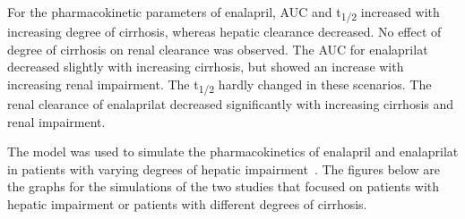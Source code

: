
For the pharmacokinetic parameters of enalapril, AUC and t\textsubscript{1/2} increased with increasing degree of cirrhosis, whereas hepatic clearance decreased. No effect of degree of cirrhosis on renal clearance was observed. The AUC for enalaprilat decreased slightly with increasing cirrhosis, but showed an increase with increasing renal impairment. The t\textsubscript{1/2} hardly changed in these scenarios. The renal clearance of enalaprilat decreased significantly with increasing cirrhosis and renal impairment.

The model was used to simulate the pharmacokinetics of enalapril and enalaprilat in patients with varying degrees of hepatic impairment~\cite{Baba1990, Ohnishi1989}. The figures below are the graphs for the simulations of the two studies that focused on patients with hepatic impairment or patients with different degrees of cirrhosis.


